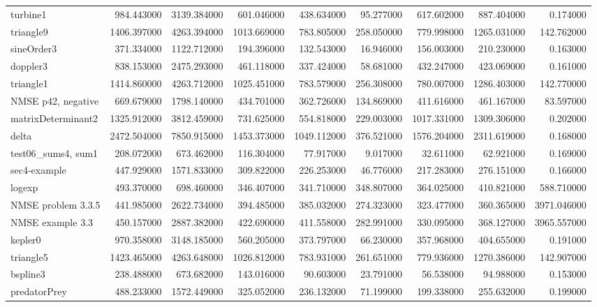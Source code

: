\begin{longtable}{lrrrrrrrr}
turbine1 & 984.443000 & 3139.384000 & 601.046000 & 438.634000 & 95.277000 & 617.602000 & 887.404000 & 0.174000 \\
triangle9 & 1406.397000 & 4263.394000 & 1013.669000 & 783.805000 & 258.050000 & 779.998000 & 1265.031000 & 142.762000 \\
sineOrder3 & 371.334000 & 1122.712000 & 194.396000 & 132.543000 & 16.946000 & 156.003000 & 210.230000 & 0.163000 \\
doppler3 & 838.153000 & 2475.293000 & 461.118000 & 337.424000 & 58.681000 & 432.247000 & 423.069000 & 0.161000 \\
triangle1 & 1414.860000 & 4263.712000 & 1025.451000 & 783.579000 & 256.308000 & 780.007000 & 1286.403000 & 142.770000 \\
NMSE p42, negative & 669.679000 & 1798.140000 & 434.701000 & 362.726000 & 134.869000 & 411.616000 & 461.167000 & 83.597000 \\
matrixDeterminant2 & 1325.912000 & 3812.459000 & 731.625000 & 554.818000 & 229.003000 & 1017.331000 & 1309.306000 & 0.202000 \\
delta & 2472.504000 & 7850.915000 & 1453.373000 & 1049.112000 & 376.521000 & 1576.204000 & 2311.619000 & 0.168000 \\
test06\_sums4, sum1 & 208.072000 & 673.462000 & 116.304000 & 77.917000 & 9.017000 & 32.611000 & 62.921000 & 0.169000 \\
sec4-example & 447.929000 & 1571.833000 & 309.822000 & 226.253000 & 46.776000 & 217.283000 & 276.151000 & 0.166000 \\
logexp & 493.370000 & 698.460000 & 346.407000 & 341.710000 & 348.807000 & 364.025000 & 410.821000 & 588.710000 \\
NMSE problem 3.3.5 & 441.985000 & 2622.734000 & 394.485000 & 385.032000 & 274.323000 & 323.477000 & 360.365000 & 3971.046000 \\
NMSE example 3.3 & 450.157000 & 2887.382000 & 422.690000 & 411.558000 & 282.991000 & 330.095000 & 368.127000 & 3965.557000 \\
kepler0 & 970.358000 & 3148.185000 & 560.205000 & 373.797000 & 66.230000 & 357.968000 & 404.655000 & 0.191000 \\
triangle5 & 1423.465000 & 4263.648000 & 1026.812000 & 783.931000 & 261.651000 & 779.936000 & 1270.386000 & 142.907000 \\
bspline3 & 238.488000 & 673.682000 & 143.016000 & 90.603000 & 23.791000 & 56.538000 & 94.988000 & 0.153000 \\
predatorPrey & 488.233000 & 1572.449000 & 325.052000 & 236.132000 & 71.199000 & 199.338000 & 255.632000 & 0.199000 \\

\end{longtable}
